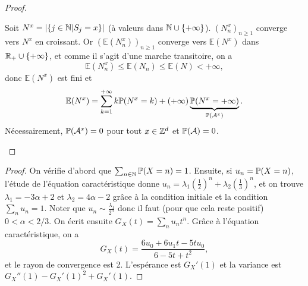 \documentclass[12pt]{article}
\begin{document}
\begin{proof}
\begin{enumerate}
        Soit $N^{x}=\left\lvert\left\lbrace j\in\N\middle| S_j=x\right\rbrace\right\rvert$ (à valeurs dans $\N\cup \lbrace+\infty\rbrace$). $(N_{n}^{x})_{n\geqslant1}$ converge vers $N^{x}$ en croissant. Or $(\mathbb{E}(N_{n}^{x}))_{n\geqslant1}$ converge vers $\mathbb{E}(N^{x})$ dans $\R_{+}\cup\lbrace+\infty\rbrace$, et comme il s'agit d'une marche transitoire, on a 
        \begin{equation}
            \mathbb{E}(N_{n}^{x})\leqslant\mathbb{E}(N_{n})\leqslant\mathbb{E}(N)<+\infty,
        \end{equation}
        donc $\mathbb{E}(N^{x})$ est fini et 
        \begin{equation}
            \mathbb{E}(N^{x})=\sum_{k=1}^{+\infty}k\P(N^{x}=k)+(+\infty)\underbrace{\P(N^{x}=+\infty)}_{\P(\mathcal{A}^{x})}.
        \end{equation}
        Nécessairement, $\P(\mathcal{A}^{x})=0$ pour tout $x\in\Z^{d}$ et $\P(\mathcal{A})=0$.
    \end{enumerate}
\end{proof}

\begin{proof}
    On vérifie d'abord que $\sum_{n\in\N}\P(X=n)=1$. Ensuite, si $u_n=\P(X=n)$, l'étude de l'équation caractéristique donne $u_n=\lambda_{1}\left(\frac{1}{2}\right)^{n}+\lambda_{2}\left(\frac{1}{3}\right)^{n}$, et on trouve $\lambda_{1}=-3\alpha+2$ et $\lambda_{2}=4\alpha-2$ grâce à la condition initiale et la condition $\sum_{n}u_n=1$. Noter que $u_n\sim\frac{\lambda_1}{2^n}$ donc il faut (pour que cela reste positif) $0<\alpha<2/3$. On écrit ensuite $G_X(t)=\sum_{n}u_nt^{n}$. Grâce à l'équation caractéristique, on a 
    \begin{equation*}
        G_X(t)=\frac{6u_0+6u_1t-5tu_0}{6-5t+t^{2}},
    \end{equation*}
    et le rayon de convergence est 2. L'espérance est $G_X'(1)$ et la variance est $G_X''(1)-G_X'(1)^{2}+G_X'(1)$.
\end{proof}
\end{document}
